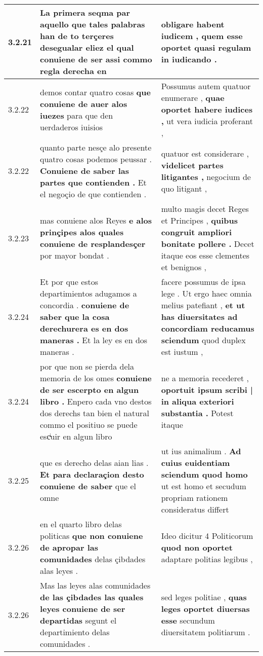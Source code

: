 \begin{tabular}{|p{1cm}|p{6.5cm}|p{6.5cm}|}
3.2.21 & La primera seqma par aquello que tales palabras han de to terçeres desegualar eliez \textbf{ el qual conuiene de ser } assi commo regla derecha en & obligare habent iudicem , \textbf{ quem esse oportet } quasi regulam in iudicando . \\\hline
3.2.22 & demos contar quatro cosas \textbf{ que conuiene de auer alos iuezes } para que den uerdaderos iuisios & Possumus autem quatuor enumerare , \textbf{ quae oportet habere iudices , } ut vera iudicia proferant , \\\hline
3.2.22 & quanto parte nesçe alo presente quatro cosas podemos peussar . \textbf{ Conuiene de saber las partes que contienden . } Et el negoçio de que contienden . & quatuor est considerare , \textbf{ videlicet partes litigantes , } negocium de quo litigant , \\\hline
3.2.23 & mas conuiene alos Reyes \textbf{ e alos prinçipes alos quales conuiene de resplandesçer } por mayor bondat . & multo magis decet Reges et Principes , \textbf{ quibus congruit ampliori bonitate pollere . } Decet itaque eos esse clementes et benignos , \\\hline
3.2.24 & Et por que estos departimientos adugamos a concordia . \textbf{ conuiene de saber que la cosa derechurera es en dos maneras . } Et la ley es en dos maneras . & facere possumus de ipsa lege . Ut ergo haec omnia melius patefiant , \textbf{ et ut has diuersitates ad concordiam reducamus sciendum } quod duplex est iustum , \\\hline
3.2.24 & por que non se pierda dela memoria de los omes \textbf{ conuiene de ser escerpto en algun libro . } Enpero cada vno destos dos derechs tan bien el natural commo el positiuo se puede escͥuir en algun libro & ne a memoria recederet , \textbf{ oportuit ipsum scribi | in aliqua exteriori substantia . } Potest itaque \\\hline
3.2.25 & que es derecho delas aian lias . \textbf{ Et para declaraçion desto conuiene de saber } que el omne & ut ius animalium . \textbf{ Ad cuius euidentiam sciendum quod homo } ut est homo et secudum propriam rationem consideratus differt \\\hline
3.2.26 & en el quarto libro delas politicas \textbf{ que non conuiene de apropar las comunidades } delas çibdades alas leyes . & Ideo dicitur 4 Politicorum \textbf{ quod non oportet } adaptare politias legibus , \\\hline
3.2.26 & Mas las leyes alas comunidades \textbf{ de las çibdades las quales leyes conuiene de ser departidas } segunt el departimiento delas comunidades . & sed leges politiae , \textbf{ quas leges oportet diuersas esse } secundum diuersitatem politiarum . \\\hline

\end{tabular}
